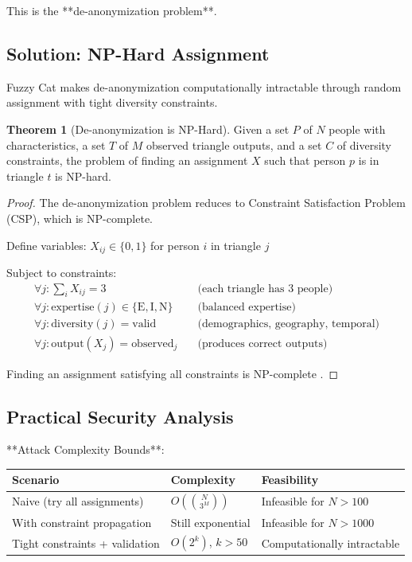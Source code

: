 \documentclass[12pt,a4paper]{article}
\theoremstyle{definition}
\newtheorem{theorem}{Theorem}[section]
\begin{document}
{This is the **de-anonymization problem**.

\subsection{Solution: NP-Hard Assignment}

Fuzzy Cat makes de-anonymization computationally intractable through random assignment with tight diversity constraints.

\begin{theorem}[De-anonymization is NP-Hard]
Given a set $P$ of $N$ people with characteristics, a set $T$ of $M$ observed triangle outputs, and a set $C$ of diversity constraints, the problem of finding an assignment $X$ such that person $p$ is in triangle $t$ is NP-hard.
\end{theorem}

\begin{proof}
The de-anonymization problem reduces to Constraint Satisfaction Problem (CSP), which is NP-complete.

Define variables: $X_{ij} \in \{0,1\}$ for person $i$ in triangle $j$

Subject to constraints:
\begin{align}
\forall j: \sum_i X_{ij} = 3 \quad &\text{(each triangle has 3 people)} \\
\forall j: \text{expertise}(j) \in \{\text{E}, \text{I}, \text{N}\} \quad &\text{(balanced expertise)} \\
\forall j: \text{diversity}(j) = \text{valid} \quad &\text{(demographics, geography, temporal)} \\
\forall j: \text{output}(X_j) = \text{observed}_j \quad &\text{(produces correct outputs)}
\end{align}

Finding an assignment satisfying all constraints is NP-complete \citep{cook2000p}.
\end{proof}

\subsection{Practical Security Analysis}

**Attack Complexity Bounds**:

\begin{table}[H]
\centering
\begin{tabular}{|l|l|l|}
\hline
\textbf{Scenario} & \textbf{Complexity} & \textbf{Feasibility} \\
\hline
Naive (try all assignments) & $O(\binom{N}{3^M})$ & Infeasible for $N > 100$ \\
\hline
With constraint propagation & Still exponential & Infeasible for $N > 1000$ \\
\hline
Tight constraints + validation & $O(2^k)$, $k > 50$ & Computationally intractable \\
\hline
\end{tabular}
\end{table}

}
\end{document}
